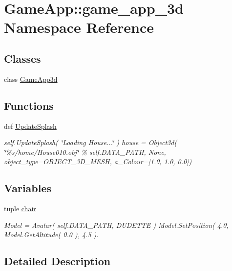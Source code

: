 \hypertarget{namespaceGameApp_1_1game__app__3d}{
\section{GameApp::game\_\-app\_\-3d Namespace Reference}
\label{namespaceGameApp_1_1game__app__3d}
}


\subsection*{Classes}
\begin{CompactItemize}
\item 
class \hyperlink{classGameApp_1_1game__app__3d_1_1GameApp3d}{GameApp3d}
\end{CompactItemize}
\subsection*{Functions}
\begin{CompactItemize}
\item 
def \hyperlink{namespaceGameApp_1_1game__app__3d_a3085aa95bfb5219ad8cd68da221b8c1}{UpdateSplash}
\begin{CompactList}\small\item\em self.UpdateSplash( \char`\"{}Loading House...\char`\"{} ) house = Object3d( \char`\"{}\%s/home/House010.obj\char`\"{} \% self.DATA\_\-PATH, None, object\_\-type=OBJECT\_\-3D\_\-MESH, a\_\-Colour=\mbox{[}1.0, 1.0, 0.0\mbox{]}) \item\end{CompactList}\end{CompactItemize}
\subsection*{Variables}
\begin{CompactItemize}
\item 
tuple \hyperlink{namespaceGameApp_1_1game__app__3d_29293ccb6c6bb28b0f15c70b628df5eb}{chair}
\begin{CompactList}\small\item\em Model = Avatar( self.DATA\_\-PATH, DUDETTE ) Model.SetPosition( 4.0, Model.GetAltitude( 0.0 ), 4.5 ). \item\end{CompactList}\end{CompactItemize}


\subsection{Detailed Description}


